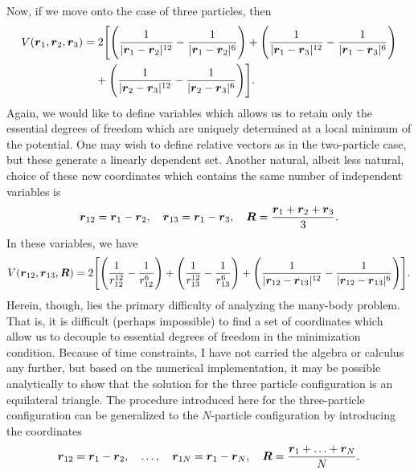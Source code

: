 Now, if we move onto the case of three particles, then
\begin{align}
    V(\vb*{r}_{1},\vb*{r}_{2},\vb*{r}_{3}) &= 2 \Bigg[ \Bigg( \frac{1}{|\vb*{r}_{1} - \vb*{r}_{2}|^{12}} - \frac{1}{|\vb*{r}_{1} - \vb*{r}_{2}|^{6}} \Bigg) + \Bigg( \frac{1}{|\vb*{r}_{1} - \vb*{r}_{3}|^{12}} - \frac{1}{|\vb*{r}_{1} - \vb*{r}_{3}|^{6}} \Bigg) \nonumber \\
    &\phantom{2\Bigg[}+ \Bigg( \frac{1}{|\vb*{r}_{2} - \vb*{r}_{3}|^{12}} - \frac{1}{|\vb*{r}_{2} - \vb*{r}_{3}|^{6}} \Bigg) \Bigg]
.\end{align}
Again, we would like to define variables which allows us to retain only the essential degrees of freedom which are uniquely determined at a local minimum of the potential.
One may wish to define relative vectors as in the two-particle case, but these generate a linearly dependent set.
Another natural, albeit less natural, choice of these new coordinates which contains the same number of independent variables is 
\begin{align}
    \vb*{r}_{12} = \vb*{r}_{1} - \vb*{r}_{2}, \quad \vb*{r}_{13} = \vb*{r}_{1} - \vb*{r}_{3}, \quad \vb*{R} = \frac{\vb*{r}_{1} + \vb*{r}_{2} + \vb*{r}_{3}}{3} 
.\end{align}
In these variables, we have
\begin{align}
    V(\vb*{r}_{12},\vb*{r}_{13},\vb*{R}) = 2 \Bigg[ \Bigg( \frac{1}{r_{12}^{12}} - \frac{1}{r_{12}^{6}} \Bigg) + \Bigg( \frac{1}{r_{13}^{12}} - \frac{1}{r_{13}^{6}} \Bigg) + \Bigg( \frac{1}{|\vb*{r}_{12} - \vb*{r}_{13}|^{12}} - \frac{1}{|\vb*{r}_{12} - \vb*{r}_{13}|^{6}} \Bigg) \Bigg]
.\end{align}
Herein, though, lies the primary difficulty of analyzing the many-body problem.
That is, it is difficult (perhaps impossible) to find a set of coordinates which allow us to decouple to essential degrees of freedom in the minimization condition.
Because of time constraints, I have not carried the algebra or calculus any further, but based on the numerical implementation, it may be possible analytically to show that the solution for the three particle configuration is an equilateral triangle.
The procedure introduced here for the three-particle configuration can be generalized to the $N$-particle configuration by introducing the coordinates
\begin{align}
    \vb*{r}_{12} = \vb*{r}_{1} - \vb*{r}_{2}, \quad \ldots, \quad \vb*{r}_{1N} = \vb*{r}_{1} - \vb*{r}_{N}, \quad \vb*{R} = \frac{\vb*{r}_{1} + \ldots + \vb*{r}_{N}}{N}
.\end{align}


